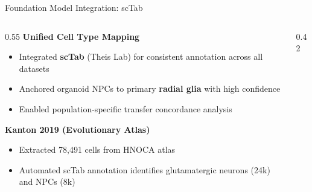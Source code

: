 \documentclass[aspectratio=169,11pt]{beamer}
\begin{document}
\begin{frame}{Foundation Model Integration: scTab}

\begin{columns}[T]
\begin{column}{0.55\textwidth}
\textbf{Unified Cell Type Mapping}
\begin{itemize}
    \item Integrated \textbf{scTab} (Theis Lab) for consistent annotation across all datasets
    \item Anchored organoid NPCs to primary \textbf{radial glia} with high confidence
    \item Enabled population-specific transfer concordance analysis
\end{itemize}

\vspace{1em}
\textbf{Kanton 2019 (Evolutionary Atlas)}
\begin{itemize}
    \item Extracted 78{,}491 cells from HNOCA atlas
    \item Automated scTab annotation identifies glutamatergic neurons (24k) and NPCs (8k)
\end{itemize}
\end{column}

\begin{column}{0.42\textwidth}
\end{column}
\end{columns}

\end{frame}

\end{document}

